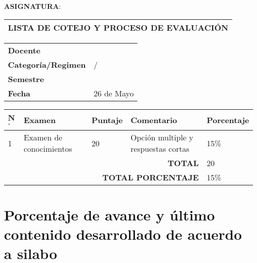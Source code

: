 \clearpage


\vspace{1cm}
{\centering 
\MakeUppercase{\textbf{Asignatura}}: \MakeUppercase{\cscourse}} \\
\vspace{0.5cm}

\begin{table}[H]
	\centering
	\begin{tabular}{|x{\textwidth}|}
		\hline 
		 \textbf{LISTA DE COTEJO Y PROCESO DE EVALUACIÓN} \\ \hline
	\end{tabular}
\end{table}

\begin{table}[H]
	\centering
	\begin{tabular}{|p{}|p{}|}
		\hline 
		\textbf{Docente} & \csauthor \\ \arrayrulecolor{black}\hline
		\textbf{Categoría/Regimen} & \cscategoria / \csregimen \\ \hline
		\textbf{Semestre} & \cssemestre \\ \hline
		\textbf{Fecha} & 26 de Mayo \\ \hline
	\end{tabular}
\end{table}

\begin{table}[H]
	\centering
	\begin{tabular}{|p{0.4cm}|p{4.8cm}|p{1.3cm}|p{5cm}|p{1.8cm}|}
		\hline 
		\textbf{N$^{\circ}$} & \textbf{Examen} & \textbf{Puntaje} & \textbf{Comentario} & \textbf{Porcentaje} \\ \hline
		1 & Examen de conocimientos & 20 & Opción multiple y respuestas cortas & 15\% \\ \hline
		\multicolumn{4}{|r|}{\textbf{TOTAL}} & 20 \\ \hline
		\multicolumn{4}{|r|}{\textbf{TOTAL PORCENTAJE}} & 15\% \\ \hline
	\end{tabular}
\end{table}

\clearpage
{}
\vspace*{\fill}
{\centering
	\section{Porcentaje de avance y último contenido desarrollado de acuerdo a silabo}}
\vspace*{\fill}

